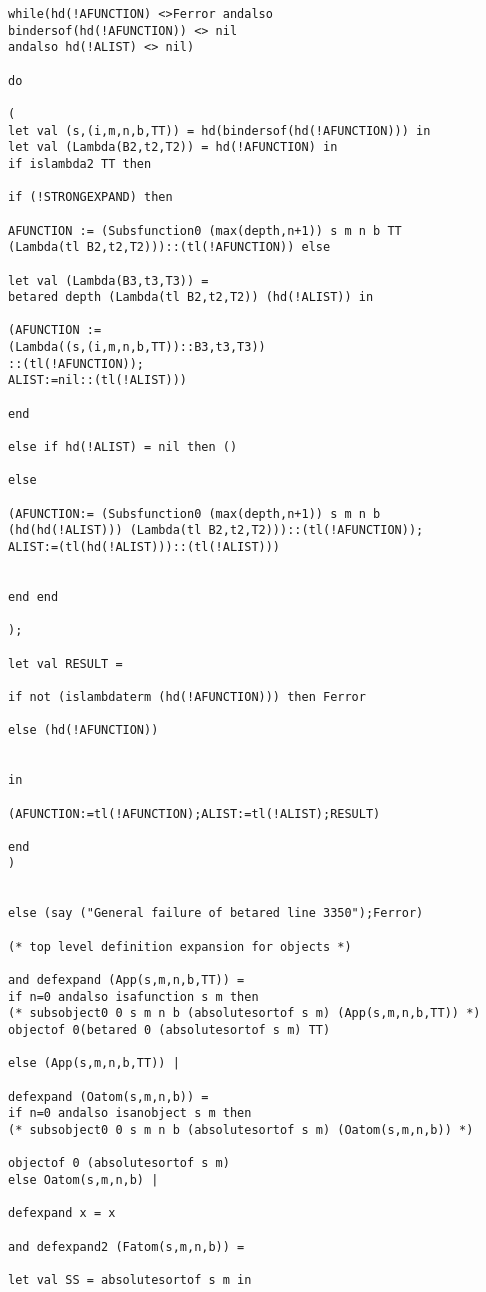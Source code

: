 \documentclass[12pt]{article}
\begin{document}
\begin{verbatim}
while(hd(!AFUNCTION) <>Ferror andalso 
bindersof(hd(!AFUNCTION)) <> nil
andalso hd(!ALIST) <> nil)

do

(
let val (s,(i,m,n,b,TT)) = hd(bindersof(hd(!AFUNCTION))) in
let val (Lambda(B2,t2,T2)) = hd(!AFUNCTION) in
if islambda2 TT then

if (!STRONGEXPAND) then 

AFUNCTION := (Subsfunction0 (max(depth,n+1)) s m n b TT 
(Lambda(tl B2,t2,T2)))::(tl(!AFUNCTION)) else 

let val (Lambda(B3,t3,T3)) = 
betared depth (Lambda(tl B2,t2,T2)) (hd(!ALIST)) in

(AFUNCTION := 
(Lambda((s,(i,m,n,b,TT))::B3,t3,T3))
::(tl(!AFUNCTION));
ALIST:=nil::(tl(!ALIST)))

end

else if hd(!ALIST) = nil then ()

else 

(AFUNCTION:= (Subsfunction0 (max(depth,n+1)) s m n b 
(hd(hd(!ALIST))) (Lambda(tl B2,t2,T2)))::(tl(!AFUNCTION));
ALIST:=(tl(hd(!ALIST)))::(tl(!ALIST))) 


end end

);

let val RESULT =

if not (islambdaterm (hd(!AFUNCTION))) then Ferror

else (hd(!AFUNCTION))


in

(AFUNCTION:=tl(!AFUNCTION);ALIST:=tl(!ALIST);RESULT)

end
)


else (say ("General failure of betared line 3350");Ferror)

(* top level definition expansion for objects *)

and defexpand (App(s,m,n,b,TT)) = 
if n=0 andalso isafunction s m then
(* subsobject0 0 s m n b (absolutesortof s m) (App(s,m,n,b,TT)) *)
objectof 0(betared 0 (absolutesortof s m) TT)

else (App(s,m,n,b,TT)) |

defexpand (Oatom(s,m,n,b)) = 
if n=0 andalso isanobject s m then
(* subsobject0 0 s m n b (absolutesortof s m) (Oatom(s,m,n,b)) *)

objectof 0 (absolutesortof s m)
else Oatom(s,m,n,b) |

defexpand x = x

and defexpand2 (Fatom(s,m,n,b)) =

let val SS = absolutesortof s m in


\end{verbatim}
\end{document}
